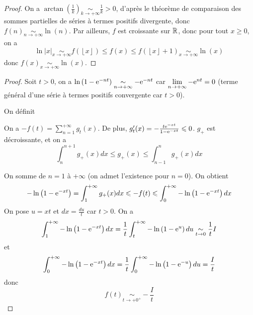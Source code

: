 \documentclass[12pt]{article}
\begin{document}
\begin{proof}
    On a $\arctan\left(\frac{1}{k}\right)\underset{k\to+\infty}{\sim}\frac{1}{k}>0$, d'après le théorème de comparaison des sommes partielles de séries à termes positifs divergente, donc $f(n)\underset{n\to+\infty}{\sim}\ln(n)$. Par ailleurs, $f$ est croissante sur $\mathbb{R}$, donc pour tout $x\geqslant0$, on a 
    \begin{equation*}
        \ln\left\lvert x\right\rvert\underset{x\to+\infty}{\sim}f\left(\left\lfloor x\right\rfloor\right)\leqslant f(x)\leqslant f\left(\left\lfloor x\right\rfloor+1\right)\underset{x\to+\infty}{\sim}\ln(x)
    \end{equation*}
    donc $f(x)\underset{x\to+\infty}{\sim}\ln(x)$.
\end{proof}

\begin{proof}
    Soit $t>0$, on a $\ln\left(1-\mathrm{e}^{-nt}\right)\underset{n\to+\infty}{\sim}-\mathrm{e}^{-nt}$ car $\lim\limits_{n\to+\infty}-\mathrm{e}^{nt}=0$ (terme général d'une série à termes positifs convergente car $t>0$).

    On définit 

    On a $-f(t)=\sum_{n=1}^{+\infty}g_{t}(x)$. De plus, $g_{t}'(x)=-\frac{t\mathrm{e}^{-xt}}{1-\mathrm{e}^{-xt}}\leqslant0$. $g_{+}$ est décroissante, et on a 
    \begin{equation*}
        \int_{n}^{n+1}g_{+}(x)dx\leqslant g_{+}(x)\leqslant\int_{n-1}^{n}g_{+}(x)dx
    \end{equation*}

    On somme de $n=1$ à $+\infty$ (on admet l'existence pour $n=0$). On obtient
    \begin{equation*}
        -\ln\left(1-\mathrm{e}^{-xt}\right)=\int_{1}^{+\infty}g_{+}(x)dx\leqslant -f(t)\leqslant\int_{0}^{+\infty}-\ln\left(1-\mathrm{e}^{-xt}\right)dx
    \end{equation*}
    On pose $u=xt$ et $dx=\frac{du}{t}$ car $t>0$. On a 
    \begin{equation*}
        \int_{1}^{+\infty}-\ln\left(1-\mathrm{e}^{-xt}\right)dx=\frac{1}{t}\int_{t}^{+\infty}-\ln\left(1-\mathrm{e}^{u}\right)du\underset{t\to0}{\sim}\frac{1}{t}I
    \end{equation*}
    et 
    \begin{equation*}
        \int_{0}^{+\infty}-\ln\left(1-\mathrm{e}^{-xt}\right)dx=\frac{1}{t}\int_{0}^{+\infty}-\ln\left(1-\mathrm{e}^{-u}\right)du=\frac{I}{t}
    \end{equation*}
    donc 
    \begin{equation*}
        \boxed{
            f(t)\underset{t\to+0^{+}}{\sim}-\frac{I}{t}
        }
    \end{equation*}
\end{proof}
\end{document}
